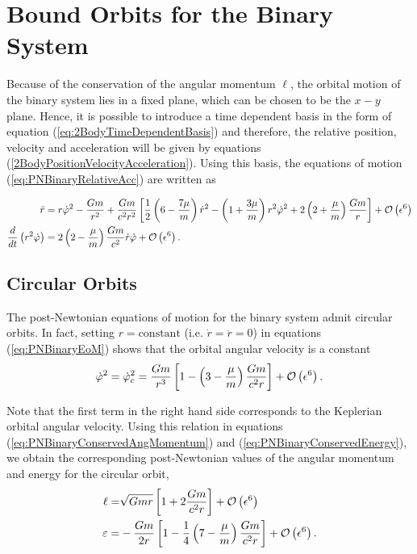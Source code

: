 \section{Bound Orbits for the Binary System}

Because of the conservation of the angular momentum $\boldsymbol{\ell}$, the orbital motion of the binary system lies in a fixed plane, which can be chosen to be the $x-y$ plane. Hence, it is possible to introduce a time dependent basis in the form of equation (\ref{eq:2BodyTimeDependentBasis}) and therefore, the relative position, velocity and acceleration will be given by equations (\ref{2BodyPositionVelocityAcceleration}). Using this basis, the equations of motion (\ref{eq:PNBinaryRelativeAcc}) are written as
\begin{footnotesize}
\begin{subequations}\label{eq:PNBinaryEoM}
\begin{align}
\ddot{r} &= r \dot{\varphi}^2 - \frac{Gm}{r^2} + \frac{Gm}{c^2r^2} \left[ \frac{1}{2} \left( 6 - \frac{7\mu}{m} \right) \dot{r}^2 - \left( 1 + \frac{3\mu}{m}\right) r^2 \dot{\varphi}^2 + 2\left(2 + \frac{\mu}{m} \right) \frac{Gm}{r} \right] + {\mathcal{O}} \left( \epsilon^6 \right) \label{eq:PNBinaryEoMr}\\
\frac{d}{dt} \left( r^2 \dot{\varphi}\right) &= 2\left( 2 - \frac{\mu}{m}\right) \frac{Gm}{c^2} \dot{r} \dot{\varphi} +{\mathcal{O}} \left( \epsilon^6 \right) .\label{eq:PNBinaryEoMvarphi}
\end{align}
\end{subequations}
\end{footnotesize}

\subsection{Circular Orbits}
The post-Newtonian equations of motion for the binary system admit circular orbits. In fact, setting $r=\textrm{constant}$ (i.e. $\dot{r} = \ddot{r} = 0$) in equations (\ref{eq:PNBinaryEoM}) shows that the orbital angular velocity is a constant
\begin{equation}
\dot{\varphi}^2 = \dot{\varphi}^2_c = \frac{Gm}{r^3} \left[ 1- \left(3-\frac{\mu}{m}\right) \frac{Gm}{c^2 r}\right] + {\mathcal{O}} \left( \epsilon^6 \right).
\end{equation}

Note that the first term in the right hand side corresponds to the Keplerian orbital angular velocity. Using this relation in equations (\ref{eq:PNBinaryConservedAngMomentum}) and (\ref{eq:PNBinaryConservedEnergy}), we obtain the corresponding post-Newtonian values of the angular momentum and energy for the circular orbit,
\begin{subequations} 
\begin{align}
\ell = & \sqrt{Gmr} \left[ 1 + 2\frac{Gm}{c^2 r}\right] + {\mathcal{O}} \left( \epsilon^6 \right) \\
\varepsilon = & -\frac{Gm}{2r} \left[ 1 - \frac{1}{4} \left( 7 - \frac{\mu}{m} \right) \frac{Gm}{c^2 r} \right] + {\mathcal{O}} \left( \epsilon^6 \right) .
\end{align}
\end{subequations}

